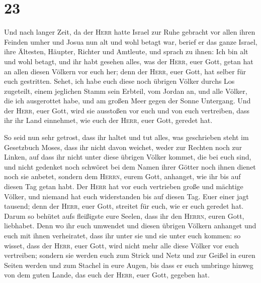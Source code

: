 \hypertarget{section-22}{%
\section{23}\label{section-22}}

 Und nach langer Zeit, da der \textsc{Herr} hatte Israel
zur Ruhe gebracht vor allen ihren Feinden umher und Josua nun alt und
wohl betagt war,  berief er das ganze Israel, ihre
Ältesten, Häupter, Richter und Amtleute, und sprach zu ihnen: Ich bin
alt und wohl betagt,  und ihr habt gesehen alles, was der
\textsc{Herr}, euer Gott, getan hat an allen diesen Völkern vor euch
her; denn der \textsc{Herr}, euer Gott, hat selber für euch gestritten.
 Sehet, ich habe euch diese noch übrigen Völker durchs Los
zugeteilt, einem jeglichen Stamm sein Erbteil, vom Jordan an, und alle
Völker, die ich ausgerottet habe, und am großen Meer gegen der Sonne
Untergang.  Und der \textsc{Herr}, euer Gott, wird sie
ausstoßen vor euch und von euch vertreiben, dass ihr ihr Land einnehmet,
wie euch der \textsc{Herr}, euer Gott, geredet hat.

 So seid nun sehr getrost, dass ihr haltet und tut alles,
was geschrieben steht im Gesetzbuch Moses, dass ihr nicht davon weichet,
weder zur Rechten noch zur Linken,  auf dass ihr nicht
unter diese übrigen Völker kommet, die bei euch sind, und nicht gedenket
noch schwöret bei dem Namen ihrer Götter noch ihnen dienet noch sie
anbetet,  sondern dem \textsc{Herrn}, eurem Gott,
anhanget, wie ihr bis auf diesen Tag getan habt.  Der
\textsc{Herr} hat vor euch vertrieben große und mächtige Völker, und
niemand hat euch widerstanden bis auf diesen Tag.  Euer
einer jagt tausend; denn der \textsc{Herr}, euer Gott, streitet für
euch, wie er euch geredet hat.  Darum so behütet aufs
fleißigste eure Seelen, dass ihr den \textsc{Herrn}, euren Gott,
liebhabet.  Denn wo ihr euch umwendet und diesen übrigen
Völkern anhanget und euch mit ihnen verheiratet, dass ihr unter sie und
sie unter euch kommen:  so wisset, dass der
\textsc{Herr}, euer Gott, wird nicht mehr alle diese Völker vor euch
vertreiben; sondern sie werden euch zum Strick und Netz und zur Geißel
in euren Seiten werden und zum Stachel in eure Augen, bis dass er euch
umbringe hinweg von dem guten Lande, das euch der \textsc{Herr}, euer
Gott, gegeben hat.


